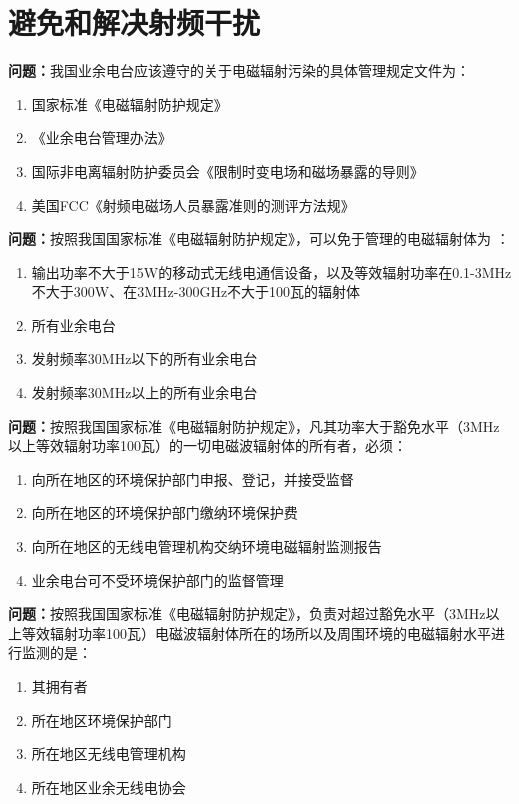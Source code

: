 \chapter{避免和解决射频干扰}


\noindent\textbf{问题：}我国业余电台应该遵守的关于电磁辐射污染的具体管理规定文件为：
\begin{enumerate}[label=\Alph*), leftmargin=3em]
	\item 国家标准《电磁辐射防护规定》
	\item 《业余电台管理办法》
	\item 国际非电离辐射防护委员会《限制时变电场和磁场暴露的导则》
	\item 美国FCC《射频电磁场人员暴露准则的测评方法规》
\end{enumerate}

\bigskip


\noindent\textbf{问题：}按照我国国家标准《电磁辐射防护规定》，可以免于管理的电磁辐射体为 ：
\begin{enumerate}[label=\Alph*), leftmargin=3em]
	\item 输出功率不大于15W的移动式无线电通信设备，以及等效辐射功率在0.1-3MHz不大于300W、在3MHz-300GHz不大于100瓦的辐射体
	\item 所有业余电台
	\item 发射频率30MHz以下的所有业余电台
	\item 发射频率30MHz以上的所有业余电台
\end{enumerate}

\bigskip


\noindent\textbf{问题：}按照我国国家标准《电磁辐射防护规定》，凡其功率大于豁免水平（3MHz以上等效辐射功率100瓦）的一切电磁波辐射体的所有者，必须：
\begin{enumerate}[label=\Alph*), leftmargin=3em]
	\item 向所在地区的环境保护部门申报、登记，并接受监督
	\item 向所在地区的环境保护部门缴纳环境保护费
	\item 向所在地区的无线电管理机构交纳环境电磁辐射监测报告
	\item 业余电台可不受环境保护部门的监督管理
\end{enumerate}

\bigskip


\noindent\textbf{问题：}按照我国国家标准《电磁辐射防护规定》，负责对超过豁免水平（3MHz以上等效辐射功率100瓦）电磁波辐射体所在的场所以及周围环境的电磁辐射水平进行监测的是：
\begin{enumerate}[label=\Alph*), leftmargin=3em]
	\item 其拥有者
	\item 所在地区环境保护部门
	\item 所在地区无线电管理机构
	\item 所在地区业余无线电协会
\end{enumerate}

